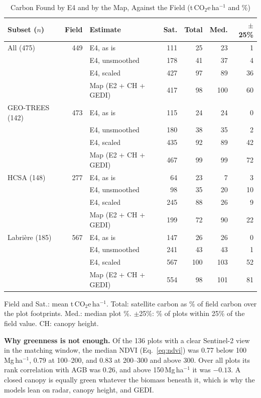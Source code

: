 \documentclass[conference,a4paper]{IEEEtran}
\begin{document}
\begin{table}[t]
\centering
\caption{Carbon Found by E4 and by the Map, Against the Field (t\,CO$_2$e\,ha$^{-1}$ and \%)}
\label{tab:e4}
\scriptsize
\setlength{\tabcolsep}{2.5pt}
\begin{tabular}{@{}l r l r r r r@{}}
\toprule
\textbf{Subset ($n$)} & \textbf{Field} & \textbf{Estimate} & \textbf{Sat.} & \textbf{Total} & \textbf{Med.} & \textbf{$\pm$25\%}\\
\midrule
All (475) & 449 & E4, as is & 111 & 25 & 23 & 1\\
 &  & E4, unsmoothed & 178 & 41 & 37 & 4\\
 &  & E4, scaled & 427 & 97 & 89 & 36\\
 &  & Map (E2 + CH + GEDI) & 417 & 98 & 100 & 60\\
\midrule
GEO-TREES (142) & 473 & E4, as is & 115 & 24 & 24 & 0\\
 &  & E4, unsmoothed & 180 & 38 & 35 & 2\\
 &  & E4, scaled & 435 & 92 & 89 & 42\\
 &  & Map (E2 + CH + GEDI) & 467 & 99 & 99 & 72\\
\midrule
HCSA (148) & 277 & E4, as is & 64 & 23 & 7 & 3\\
 &  & E4, unsmoothed & 98 & 35 & 20 & 10\\
 &  & E4, scaled & 245 & 88 & 26 & 9\\
 &  & Map (E2 + CH + GEDI) & 199 & 72 & 90 & 22\\
\midrule
Labri\`ere (185) & 567 & E4, as is & 147 & 26 & 26 & 0\\
 &  & E4, unsmoothed & 241 & 43 & 43 & 1\\
 &  & E4, scaled & 567 & 100 & 103 & 52\\
 &  & Map (E2 + CH + GEDI) & 554 & 98 & 101 & 81\\
\bottomrule
\end{tabular}

\vspace{2pt}
{\scriptsize Field and Sat.: mean t\,CO$_2$e\,ha$^{-1}$. Total: satellite carbon as \% of field carbon over the plot footprints. Med.: median plot \%. $\pm$25\%: \% of plots within 25\% of the field value. CH: canopy height.\par}
\end{table}

\textbf{Why greenness is not enough.} Of the 136 plots with a clear Sentinel-2 view in the matching window, the median NDVI (Eq.~\ref{eq:ndvi}) was 0.77 below 100\,Mg\,ha$^{-1}$, 0.79 at 100--200, and 0.83 at 200--300 and above 300. Over all plots its rank correlation with AGB was 0.26, and above 150\,Mg\,ha$^{-1}$ it was $-0.13$. A closed canopy is equally green whatever the biomass beneath it, which is why the models lean on radar, canopy height, and GEDI.
\end{document}

